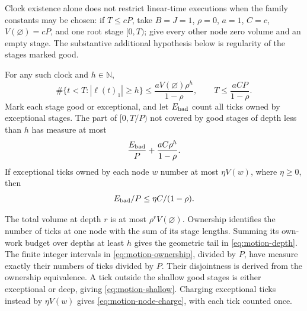Clock existence alone does not restrict linear-time executions when the
family constants may be chosen: if $T\le cP$, take $B=J=1$, $\rho=0$,
$a=1$, $C=c$, $V(\varnothing)=cP$, and one root stage $[0,T)$; give every
other node zero volume and an empty stage.  The substantive additional
hypothesis below is regularity of the stages marked good.

\begin{lemma}
\label{lem:motion-clock-accounting}
For any such clock and $h\in\mathbb N$,
\begin{equation}
\label{eq:motion-depth}
 \#\{t<T:|\ell(t)_1|\ge h\}
 \le\frac{aV(\varnothing)\rho^h}{1-\rho},
 \qquad
 T\le\frac{aCP}{1-\rho}.
\end{equation}
Mark each stage good or exceptional, and let $E_{\rm bad}$ count all ticks
owned by exceptional stages.  The part of $[0,T/P)$ not covered by good
stages of depth less than $h$ has measure at most
\begin{equation}
\label{eq:motion-shallow}
 \frac{E_{\rm bad}}P+\frac{aC\rho^h}{1-\rho}.
\end{equation}
If exceptional ticks owned by each node $w$ number at most $\eta V(w)$,
where $\eta\ge0$, then
\begin{equation}
\label{eq:motion-node-charge}
 E_{\rm bad}/P\le\eta C/(1-\rho).
\end{equation}
\end{lemma}

\begin{proofoutline}
The total volume at depth $r$ is at most $\rho^rV(\varnothing)$.
Ownership identifies the number of ticks at one node with the sum of its
stage lengths.  Summing its own-work budget over depths at least $h$ gives
the geometric tail in \eqref{eq:motion-depth}.  The finite integer intervals
in \eqref{eq:motion-ownership}, divided by $P$, have measure exactly their
numbers of ticks divided by $P$.  Their disjointness is derived from the
ownership equivalence.  A tick outside the shallow good stages is either
exceptional or deep, giving \eqref{eq:motion-shallow}.  Charging exceptional
ticks instead by $\eta V(w)$ gives \eqref{eq:motion-node-charge}, with each
tick counted once.
\end{proofoutline}

